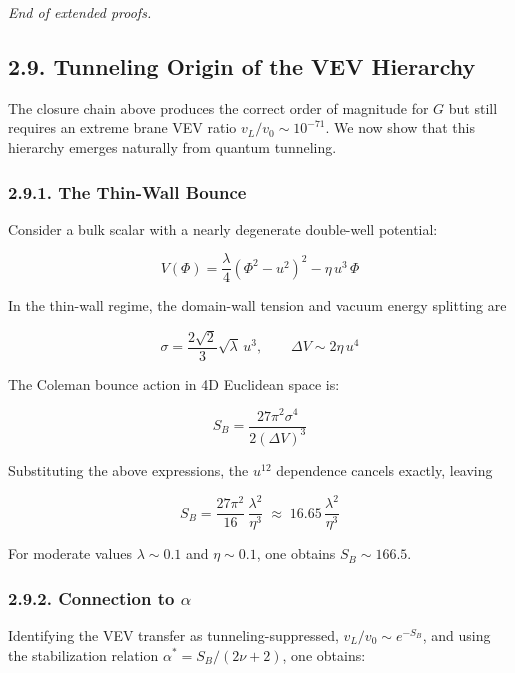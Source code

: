 \documentclass[
  11pt,
]{article}
\begin{document}
\emph{End of extended proofs.}

\bigskip

\hypertarget{tunneling-origin-of-the-vev-hierarchy}{%
\subsection{2.9. Tunneling Origin of the VEV
Hierarchy}\label{tunneling-origin-of-the-vev-hierarchy}}

The closure chain above produces the correct order of magnitude for
\(G\) but still requires an extreme brane VEV ratio
\(v_L/v_0 \sim 10^{-71}\). We now show that this hierarchy emerges
naturally from quantum tunneling.

\hypertarget{the-thin-wall-bounce}{%
\subsubsection{2.9.1. The Thin-Wall Bounce}\label{the-thin-wall-bounce}}

Consider a bulk scalar with a nearly degenerate double-well potential:

\[V(\Phi) = \frac{\lambda}{4}(\Phi^2 - u^2)^2 - \eta\,u^3\,\Phi \tag{94}\]

In the thin-wall regime, the domain-wall tension and vacuum energy
splitting are

\[\sigma = \frac{2\sqrt{2}}{3}\sqrt{\lambda}\,u^3, \qquad \Delta V \sim 2\eta\,u^4 \tag{95}\]

The Coleman bounce action in 4D Euclidean space is:

\[S_B = \frac{27\pi^2 \sigma^4}{2(\Delta V)^3} \tag{96}\]

Substituting the above expressions, the \(u^{12}\) dependence cancels
exactly, leaving

\[\boxed{S_B = \frac{27\pi^2}{16}\,\frac{\lambda^2}{\eta^3} \;\approx\; 16.65\,\frac{\lambda^2}{\eta^3}} \tag{97}\]

For moderate values \(\lambda \sim 0.1\) and \(\eta \sim 0.1\), one
obtains \(S_B \sim 166.5\).

\hypertarget{connection-to-alpha}{%
\subsubsection{\texorpdfstring{2.9.2. Connection to
\(\alpha\)}{2.9.2. Connection to \textbackslash alpha}}\label{connection-to-alpha}}

Identifying the VEV transfer as tunneling-suppressed,
\(v_L/v_0 \sim e^{-S_B}\), and using the stabilization relation
\(\alpha^* = S_B/(2\nu + 2)\), one obtains:
\end{document}

